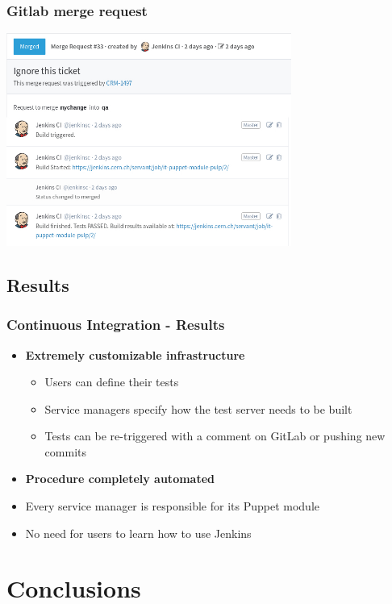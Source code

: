 \documentclass[aspectratio=169]{beamer}
\begin{document}

\begin{frame}
    \frametitle{Gitlab merge request}
    \centering
    \includegraphics[width=0.7\textwidth]{gitlab_merge_to_qa_final.jpg}
\end{frame}


\subsection{Results}
\begin{frame}
    \frametitle{Continuous Integration - Results}
    \begin{itemize}
        \item \textbf{Extremely customizable infrastructure}
        \begin{itemize}
            \item Users can define their tests
            \item Service managers specify how the test server needs to be built
            \item Tests can be re-triggered with a comment on GitLab or pushing new commits
        \end{itemize}
        \item \textbf{Procedure completely automated}
        \item Every service manager is responsible for its Puppet module
        \item No need for users to learn how to use Jenkins
    \end{itemize}
\end{frame}

\section{Conclusions}
\end{document}
